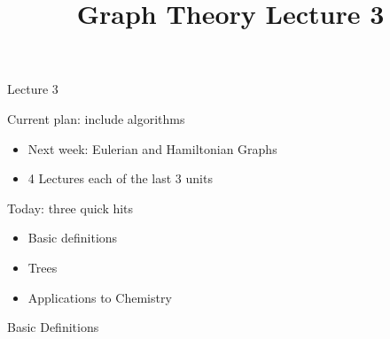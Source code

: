 \documentclass{beamer}
\title{Graph Theory Lecture 3}
\begin{document}
\begin{frame}{Lecture 3}
  \begin{block}{Current plan: include algorithms}
    \begin{itemize}
    \item Next week: Eulerian and Hamiltonian Graphs
    \item 4 Lectures each of the last 3 units
    \end{itemize}
  \end{block}
  
    \begin{block}{Today: three quick hits}
\begin{itemize}
    \item Basic definitions
    \item Trees
    \item Applications to Chemistry
      \end{itemize}
    \end{block}
  
  \end{frame}

\begin{frame}[plain,c]

\begin{center}

\Huge

Basic Definitions
\end{center}

\end{frame}
\end{document}
